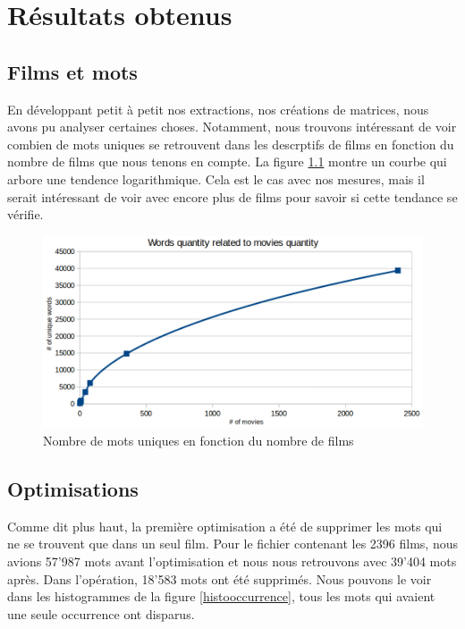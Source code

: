 \chapter{Résultats obtenus}
\section{Films et mots}

En développant petit à petit nos extractions, nos créations de matrices, nous avons pu analyser certaines choses. Notamment, nous trouvons intéressant de voir combien de mots uniques se retrouvent dans les descrptifs de films en fonction du nombre de films que nous tenons en compte. La figure \ref{wordsmoviefunction} montre un courbe qui arbore une tendence logarithmique. Cela est le cas avec nos mesures, mais il serait intéressant de voir avec encore plus de films pour savoir si cette tendance se vérifie.

\begin{figure}[h]
  \centering
    \includegraphics[width=0.9\linewidth]{img/wordsmoviefunction.png}
  \caption{Nombre de mots uniques en fonction du nombre de films}
  \label{wordsmoviefunction}
\end{figure}


\section{Optimisations}

Comme dit plus haut, la première optimisation a été de supprimer les mots qui ne se trouvent que dans un seul film. Pour le fichier contenant les 2396 films, nous avions 57'987 mots avant l'optimisation et nous nous retrouvons avec 39'404 mots après. Dans l'opération, 18'583 mots ont été supprimés. Nous pouvons le voir dans les histogrammes de la figure \ref{histooccurrence}, tous les mots qui avaient une seule occurrence ont disparus.

